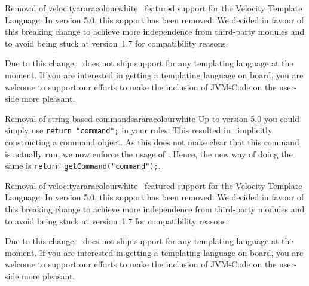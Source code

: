 \begin{messagebox}{Removal of velocity}{araracolour}{\icinfo}{white}
\arara\ featured support for the Velocity Template Language. In version 5.0, this support has been removed. We decided in favour of this breaking change to achieve more independence from third-party modules and to avoid being stuck at version~1.7 for compatibility reasons.

Due to this change, \arara\ does not ship support for any templating language at the moment. If you are interested in getting a templating language on board, you are welcome to support our efforts to make the inclusion of JVM-Code on the user-side more pleasant.
\end{messagebox}

\begin{messagebox}{Removal of string-based commands}{araracolour}{\icinfo}{white}
Up to version 5.0 you could simply use \verb|return "command";| in your rules. This resulted in \arara\ implicitly constructing a command object. As this does not make clear that this command is actually run, we now enforce the usage of . Hence, the new way of doing the same is \verb|return getCommand("command");|.
\end{messagebox}

\begin{messagebox}{Removal of velocity}{araracolour}{\icinfo}{white}
\arara\ featured support for the Velocity Template Language. In version 5.0, this support has been removed. We decided in favour of this breaking change to achieve more independence from third-party modules and to avoid being stuck at version~1.7 for compatibility reasons.

Due to this change, \arara\ does not ship support for any templating language at the moment. If you are interested in getting a templating language on board, you are welcome to support our efforts to make the inclusion of JVM-Code on the user-side more pleasant.
\end{messagebox}

